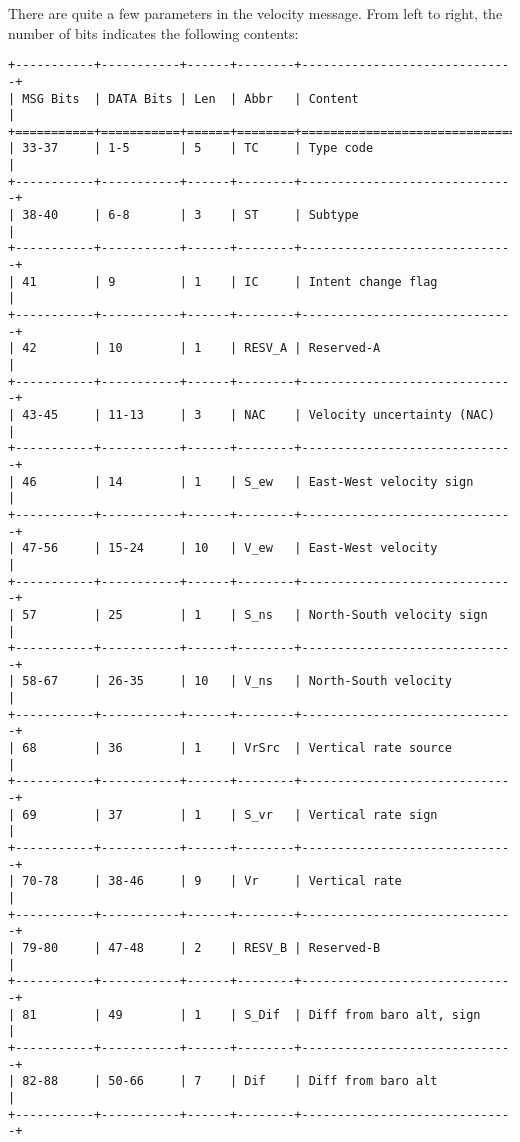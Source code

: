 There are quite a few parameters in the velocity message. From left to
right, the number of bits indicates the following contents:

\begin{verbatim}
+-----------+-----------+------+--------+------------------------------+
| MSG Bits  | DATA Bits | Len  | Abbr   | Content                      |
+===========+===========+======+========+==============================+
| 33-37     | 1-5       | 5    | TC     | Type code                    |
+-----------+-----------+------+--------+------------------------------+
| 38-40     | 6-8       | 3    | ST     | Subtype                      |
+-----------+-----------+------+--------+------------------------------+
| 41        | 9         | 1    | IC     | Intent change flag           |
+-----------+-----------+------+--------+------------------------------+
| 42        | 10        | 1    | RESV_A | Reserved-A                   |
+-----------+-----------+------+--------+------------------------------+
| 43-45     | 11-13     | 3    | NAC    | Velocity uncertainty (NAC)   |
+-----------+-----------+------+--------+------------------------------+
| 46        | 14        | 1    | S_ew   | East-West velocity sign      |
+-----------+-----------+------+--------+------------------------------+
| 47-56     | 15-24     | 10   | V_ew   | East-West velocity           |
+-----------+-----------+------+--------+------------------------------+
| 57        | 25        | 1    | S_ns   | North-South velocity sign    |
+-----------+-----------+------+--------+------------------------------+
| 58-67     | 26-35     | 10   | V_ns   | North-South velocity         |
+-----------+-----------+------+--------+------------------------------+
| 68        | 36        | 1    | VrSrc  | Vertical rate source         |
+-----------+-----------+------+--------+------------------------------+
| 69        | 37        | 1    | S_vr   | Vertical rate sign           |
+-----------+-----------+------+--------+------------------------------+
| 70-78     | 38-46     | 9    | Vr     | Vertical rate                |
+-----------+-----------+------+--------+------------------------------+
| 79-80     | 47-48     | 2    | RESV_B | Reserved-B                   |
+-----------+-----------+------+--------+------------------------------+
| 81        | 49        | 1    | S_Dif  | Diff from baro alt, sign     |
+-----------+-----------+------+--------+------------------------------+
| 82-88     | 50-66     | 7    | Dif    | Diff from baro alt           |
+-----------+-----------+------+--------+------------------------------+
\end{verbatim}

